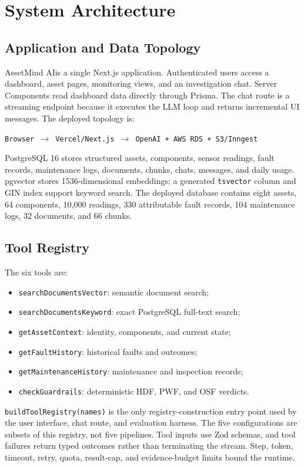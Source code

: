 \documentclass[conference]{IEEEtran}
\newcommand{\system}{AssetMind AI}
\begin{document}
\section{System Architecture}
\subsection{Application and Data Topology}
\system is a single Next.js application. Authenticated users access a
dashboard, asset pages, monitoring views, and an investigation chat. Server
Components read dashboard data directly through Prisma. The chat route is a
streaming endpoint because it executes the LLM loop and returns incremental
UI messages. The deployed topology is:
\begin{center}
\footnotesize
\texttt{Browser $\rightarrow$ Vercel/Next.js $\rightarrow$
OpenAI + AWS RDS + S3/Inngest}
\end{center}

PostgreSQL 16 stores structured assets, components, sensor readings, fault
records, maintenance logs, documents, chunks, chats, messages, and daily
usage. pgvector stores 1536-dimensional embeddings; a generated
\texttt{tsvector} column and GIN index support keyword search. The deployed
database contains eight assets, 64 components, 10,000 readings, 330
attributable fault records, 104 maintenance logs, 32 documents, and 66
chunks.

\subsection{Tool Registry}
The six tools are:
\begin{itemize}
\item \texttt{searchDocumentsVector}: semantic document search;
\item \texttt{searchDocumentsKeyword}: exact PostgreSQL full-text search;
\item \texttt{getAssetContext}: identity, components, and current state;
\item \texttt{getFaultHistory}: historical faults and outcomes;
\item \texttt{getMaintenanceHistory}: maintenance and inspection records;
\item \texttt{checkGuardrails}: deterministic HDF, PWF, and OSF verdicts.
\end{itemize}

\texttt{buildToolRegistry(names)} is the only registry-construction entry
point used by the user interface, chat route, and evaluation harness. The
five configurations are subsets of this registry, not five pipelines. Tool
inputs use Zod schemas, and tool failures return typed outcomes rather than
terminating the stream. Step, token, timeout, retry, quota, result-cap, and
evidence-budget limits bound the runtime.
\end{document}
